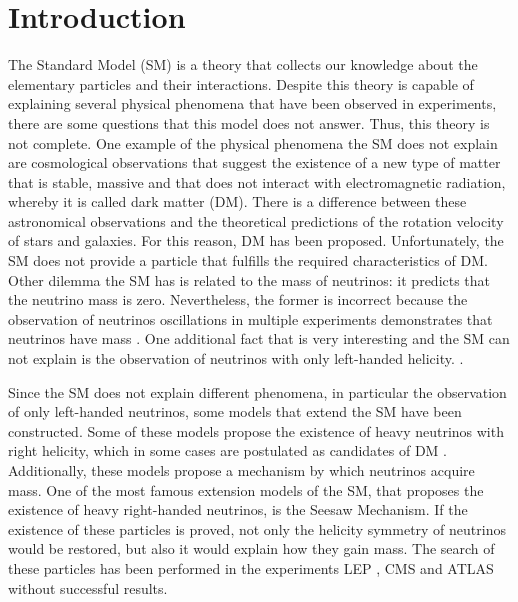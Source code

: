 \chapter{Introduction}
\label{Introduction_chapter}


The Standard Model (SM) is a theory that collects our knowledge about the elementary particles and their interactions. Despite this theory is capable of explaining several physical phenomena that have been observed in experiments, there are some questions that this model does not answer. Thus, this theory is not complete. One example of the physical phenomena the SM does not explain are cosmological observations that suggest the existence of a new type of matter that is stable, massive and that does not interact with electromagnetic radiation, whereby it is called dark matter (DM). There is a difference between these astronomical observations and the theoretical predictions of the rotation velocity of stars and galaxies. For this reason, DM has been proposed. Unfortunately, the SM does not provide a particle that fulfills the required characteristics of DM. Other dilemma the SM has is related to the mass of neutrinos: it predicts that the neutrino mass is zero. Nevertheless, the former is incorrect because the observation of neutrinos oscillations in multiple experiments demonstrates that neutrinos have mass \cite{Neutrino experiment 1 mass, Neutrino experiment 2 mass}. One additional fact that is very interesting and the SM can not explain is the observation of neutrinos with only left-handed helicity. . 

Since the SM does not explain different phenomena, in particular the observation of only left-handed neutrinos, some models that extend the SM have been constructed. Some of these models propose the existence of heavy neutrinos with right helicity, which in some cases are postulated as candidates of DM \cite{Neutrino dark matter candidate 1, Neutrino dark matter candidate 2}. Additionally, these models propose a mechanism by which neutrinos acquire mass. One of the most famous extension models of the SM, that proposes the existence of heavy right-handed neutrinos, is the Seesaw Mechanism. If the existence of these particles is proved, not only the helicity symmetry of neutrinos would be restored, but also it would explain how they gain mass. The search of these particles has been performed in the experiments LEP \cite{Lep experiment}, CMS \cite{CMS experiment} and ATLAS \cite{ATLAS experiment} without successful results.

